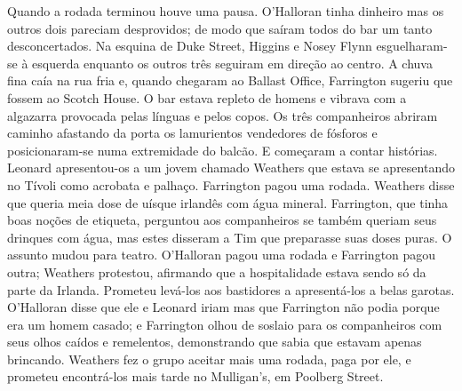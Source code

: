 Quando a rodada terminou houve uma pausa. O'Halloran tinha dinheiro
mas os outros dois pareciam desprovidos; de modo que saíram todos do
bar um tanto desconcertados. Na esquina de Duke Street, Higgins e
Nosey Flynn esguelharam-se à esquerda enquanto os outros três
seguiram em direção ao centro. A chuva fina caía na rua fria e,
quando chegaram ao Ballast Office, Farrington sugeriu que fossem ao
Scotch House. O bar estava repleto de homens e vibrava com a algazarra
provocada pelas línguas e pelos copos. Os três companheiros abriram
caminho afastando da porta os lamurientos vendedores de fósforos e
posicionaram-se numa extremidade do balcão. E começaram a contar
histórias. Leonard apresentou-os a um jovem chamado Weathers que
estava se apresentando no Tívoli como acrobata e palhaço. Farrington
pagou uma rodada. Weathers disse que queria meia dose de uísque
irlandês com água mineral. Farrington, que tinha boas noções de
etiqueta, perguntou aos companheiros se também queriam seus drinques
com água, mas estes disseram a Tim que preparasse suas doses puras. O
assunto mudou para teatro. O'Halloran pagou
uma rodada e Farrington pagou outra; Weathers protestou, afirmando
que a hospitalidade estava sendo só da parte da Irlanda. Prometeu
levá-los aos bastidores a apresentá-los a belas garotas. O'Halloran
disse que ele e Leonard iriam mas que Farrington não podia porque era
um homem casado; e Farrington olhou de soslaio para os companheiros
com seus olhos caídos e remelentos, demonstrando que sabia que estavam
apenas brincando. Weathers fez o grupo aceitar mais uma rodada, paga
por ele, e prometeu encontrá-los mais tarde no Mulligan's, em Poolberg
Street.

